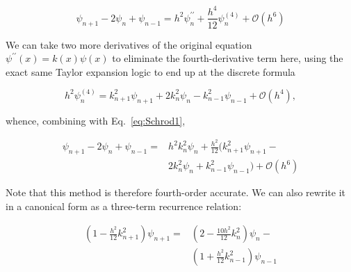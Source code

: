 \documentclass[%
 reprint,
 amsmath,amssymb,
 aps,
 nofootinbib
]{revtex4-1}
\begin{document}
%

\begin{equation}
\psi_{n+1} - 2 \psi_n + \psi_{n-1} = h^2 \psi_n^{\prime\prime} + \frac{h^4}{12} \psi^{(4)}_n + \mathcal{O}(h^6)
\label{eq:Schrod1}
\end{equation}

\noindent We can take two more derivatives of the original equation  $\psi^{\prime\prime}(x) = k(x) \psi(x)$ to eliminate the fourth-derivative term here, using the exact same Taylor expansion logic to end up at the discrete formula

\begin{equation}
h^2 \psi^{(4)}_n = k^2_{n+1} \psi_{n+1} + 2 k^2_n \psi_n - k^2_{n-1} \psi_{n-1} + \mathcal{O}(h^4), 
\end{equation} 

\noindent whence, combining with Eq.~\ref{eq:Schrod1},

\begin{eqnarray*}
\psi_{n+1}-2\psi_n+\psi_{n-1} =& h^2k^2_n \psi_n + \frac{h^2}{12 } ( k^2_{n+1}\psi_{n+1} - \\ &2 k^2_n \psi_n + k^2_{n-1} \psi_{n-1} ) + \mathcal{O}(h^6)
\end{eqnarray*}

\noindent Note that this method is therefore fourth-order accurate. We can also rewrite it in a canonical form as a three-term recurrence relation:

\begin{eqnarray*}
\left( 1 - \frac{h^2}{12} k_{n+1}^2 \right)  \psi_{n+1} =& \left(2-\frac{10 h^2}{12}k_n^2 \right) \psi_n - \\ &\left( 1 + \frac{h^2}{12}k_{n-1}^2 \right) \psi_{n-1}
\end{eqnarray*}
\end{document}
